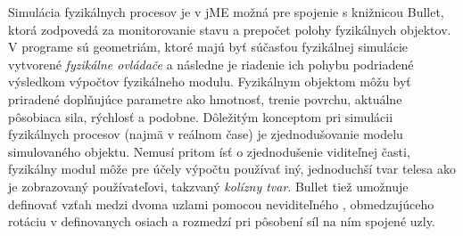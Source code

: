 Simulácia fyzikálnych procesov je v jME možná pre spojenie s knižnicou Bullet, ktorá zodpovedá za monitorovanie stavu a prepočet polohy fyzikálnych objektov. V programe sú geometriám, ktoré majú byť súčasťou fyzikálnej simulácie vytvorené \textit{fyzikálne ovládače} a následne je riadenie ich pohybu podriadené výsledkom výpočtov fyzikálneho modulu. Fyzikálnym objektom môžu byť priradené doplňujúce parametre ako hmotnosť, trenie povrchu, aktuálne pôsobiaca sila, rýchlosť a podobne. Dôležitým konceptom pri simulácii fyzikálnych procesov (najmä v reálnom čase) je zjednodušovanie modelu simulovaného objektu. Nemusí pritom ísť o zjednodušenie viditeľnej časti, fyzikálny modul môže pre účely výpočtu používať iný, jednoduchší tvar telesa ako je zobrazovaný používateľovi, takzvaný \textit{kolízny tvar}. Bullet tiež umožnuje definovať vzťah medzi dvoma uzlami pomocou neviditeľného , obmedzujúceho rotáciu v definovanych osiach a rozmedzí pri pôsobení síl na ním spojené uzly.
